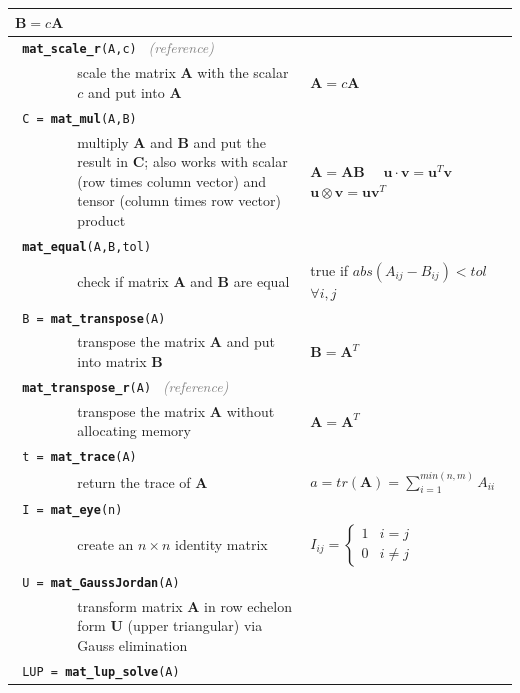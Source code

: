\documentclass[10pt]{article}
\begin{document}
\begin{longtable}{@{} p{1.5cm} p{7cm} p{3cm} @{}}
$\mathbf{B}=c\mathbf{A}$ \\
\hline
\multicolumn{2}{l}{\texttt{ \textbf{mat\_scale\_r}(A,c) } \hfill \textit{\textcolor{gray}{(reference)}}} \\
& scale the matrix $\mathbf{A}$ with the scalar $c$ and put into $\mathbf{A}$ &
$\mathbf{A}=c\mathbf{A}$ \\
\hline
\multicolumn{2}{l}{\texttt{ C = \textbf{mat\_mul}(A,B) }} \\
& multiply $\mathbf{A}$ and $\mathbf{B}$ and put the result in $\mathbf{C}$; also works with scalar (row times column vector) and tensor (column times row vector) product &
$\mathbf{A}=\mathbf{A}\mathbf{B}\quad$  $\mathbf{u}\cdot\mathbf{v}=\mathbf{u}^T\mathbf{v}\quad$   $\mathbf{u}\otimes\mathbf{v}=\mathbf{u}\mathbf{v}^T$ \\
\hline
\multicolumn{2}{l}{\texttt{ \textbf{mat\_equal}(A,B,tol) }} \\
& check if matrix $\mathbf{A}$ and $\mathbf{B}$ are equal &
true if $abs(A_{ij}-B_{ij}) < tol$ $\forall i,j$ \\
\hline
\multicolumn{2}{l}{\texttt{ B = \textbf{mat\_transpose}(A) }} \\
& transpose the matrix $\mathbf{A}$ and put into matrix $\mathbf{B}$ &
$\mathbf{B}=\mathbf{A}^T$ \\
\hline
\multicolumn{2}{l}{\texttt{ \textbf{mat\_transpose\_r}(A) } \hfill \textit{\textcolor{gray}{(reference)}}} \\
& transpose the matrix $\mathbf{A}$ without allocating memory &
$\mathbf{A}=\mathbf{A}^T$ \\
\hline
\multicolumn{2}{l}{\texttt{ t = \textbf{mat\_trace}(A) }} \\
& return the trace of $\mathbf{A}$ &
$a = tr(\mathbf{A}) = \sum_{i=1}^{min(n,m)} A_{ii}$ \\
\hline
\multicolumn{2}{l}{\texttt{ I = \textbf{mat\_eye}(n) }} \\
& create an $n\times n$ identity matrix &
$I_{ij} =
\begin{cases}
1 & i=j \\
0 & i\neq j
\end{cases}$ \\
\hline
\multicolumn{2}{l}{\texttt{ U = \textbf{mat\_GaussJordan}(A) }} \\
& transform matrix $\mathbf{A}$ in row echelon form $\mathbf{U}$ (upper triangular) via Gauss elimination & \\
\hline
\multicolumn{2}{l}{\texttt{ LUP = \textbf{mat\_lup\_solve}(A) }} \\

\end{longtable}
\end{document}
